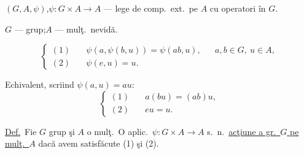 \bigskip
\noindent $(G,A,\psi)$,\quad $\psi:G\times A\longrightarrow A$ --- lege de comp.\ ext.\
pe $A$ cu operatori în $G$.

\noindent $G$ --- grup;\quad $A$ --- mulţ.\ nevidă.

\[
\left\{\begin{aligned}
(1)\quad &\psi(a,\psi(b,u))=\psi(ab,u), && a,b\in G,\ u\in A,\\
(2)\quad &\psi(e,u)=u.
\end{aligned}\right.
\]

\noindent Echivalent, scriind $\psi(a,u)=au$:
\[
\left\{\begin{aligned}
(1)\quad &a(bu)=(ab)u,\\
(2)\quad &eu=u.
\end{aligned}\right.
\]

\bigskip
\noindent\underline{Def.}\ Fie $G$ grup şi $A$ o mulţ.\ O aplic.\
$\psi:G\times A\longrightarrow A$ s.\ n.\ \underline{acţiune a gr.\ $G$ pe mulţ.\ $A$}
dacă avem satisfăcute (1) şi (2).
